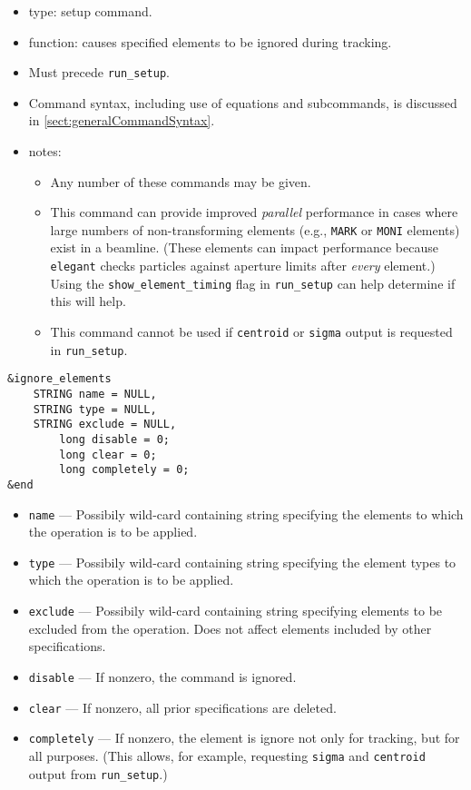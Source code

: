 \documentclass[11pt]{article}
\begin{document}
\begin{itemize}
\item type: setup command.
\item function: causes specified elements to be ignored during tracking.
\item Must precede \verb|run_setup|.
\item Command syntax, including use of equations and subcommands, is discussed in \ref{sect:generalCommandSyntax}.
\item notes: 
	\begin{itemize}
	\item Any number of these commands may be given.
	\item This command can provide improved {\em parallel} performance in cases where large numbers
          of non-transforming elements (e.g., \verb|MARK| or \verb|MONI| elements) exist in a beamline.
          (These elements can impact performance because \verb|elegant| checks particles against aperture
          limits after {\em every} element.)
          Using the \verb|show_element_timing| flag in \verb|run_setup| can help determine if this
          will help.
        \item This command cannot be used if \verb|centroid| or \verb|sigma| output is requested in
          \verb|run_setup|.
	\end{itemize}
\end{itemize}

\begin{verbatim}
&ignore_elements
	STRING name = NULL,
	STRING type = NULL,
	STRING exclude = NULL,
        long disable = 0;
        long clear = 0;
        long completely = 0;
&end
\end{verbatim}

\begin{itemize}
\item \verb|name| --- Possibily wild-card containing string specifying the
	elements to which the operation is to be applied.
\item \verb|type| --- Possibily wild-card containing string specifying the
	element types to which the operation is to be applied.
\item \verb|exclude| --- Possibily wild-card containing string specifying 
	elements to be excluded from the operation. Does not
	affect elements included by other specifications.
\item \verb|disable| --- If nonzero, the command is ignored.
\item \verb|clear| --- If nonzero, all prior specifications are deleted.
\item \verb|completely| --- If nonzero, the element is ignore not only for tracking, but
  for all purposes. (This allows, for example, requesting \verb|sigma| and \verb|centroid| output
  from \verb|run_setup|.)
\end{itemize}
\end{document}
